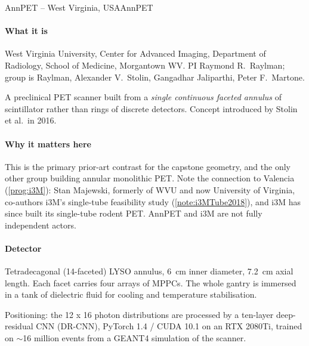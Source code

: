  
 
\begin{programnote}{AnnPET -- West Virginia, USA}{AnnPET}
 
\paragraph{What it is}
West Virginia University, Center for Advanced Imaging, Department of Radiology,
School of Medicine, Morgantown WV. PI Raymond R.\ Raylman; group is Raylman,
Alexander V.\ Stolin, Gangadhar Jaliparthi, Peter F.\ Martone.
 
A preclinical PET scanner built from a \emph{single continuous faceted annulus}
of scintillator rather than rings of discrete detectors. Concept introduced by
Stolin et al.\ in 2016.
 
\paragraph{Why it matters here}
This is the primary prior-art contrast for the capstone geometry, and the only
other group building annular monolithic PET. Note the connection to Valencia
(\ref{prog:i3M}): Stan Majewski, formerly of WVU and now University of
Virginia, co-authors i3M's single-tube feasibility study
(\ref{note:i3MTube2018}), and i3M has since built its single-tube rodent PET.
AnnPET and i3M are not fully independent actors.
 
\paragraph{Detector}
Tetradecagonal (14-faceted) LYSO annulus, \qty{6}{\centi\metre} inner diameter,
\qty{7.2}{\centi\metre} axial length. Each facet carries four
 arrays of  MPPCs. The whole
gantry is immersed in a tank of dielectric fluid for cooling and temperature
stabilisation.
 
Positioning: the 12 x 16 photon distributions are processed by a ten-layer
deep-residual CNN (DR-CNN), PyTorch 1.4 / CUDA 10.1 on an RTX 2080Ti, trained on
$\sim$16 million events from a GEANT4 simulation of the scanner.
 

\end{programnote}
